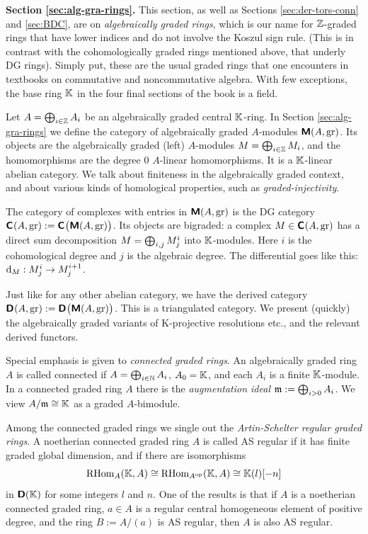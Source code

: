 \medskip \noindent 
{\bf Section \ref{sec:alg-gra-rings}.}
This section, as well as Sections \ref{sec:der-tors-conn} and \ref{sec:BDC}, 
are on {\em algebraically graded rings}, which is our name for 
$\mathbb{Z}$-graded rings that have lower indices and do not involve the Koszul sign 
rule.  (This is in contrast with the cohomologically graded rings mentioned 
above, that underly DG rings). Simply put, these are the usual graded rings 
that one encounters in textbooks on commutative and noncommutative algebra. 
With few exceptions, the base ring $\mathbb{K}$ in the four final sections of the book 
is a field. 

Let $A = \bigoplus\nolimits_{i \in \mathbb{Z}} A_i$ be an algebraically graded central $\mathbb{K}$-ring. 
In Section \ref{sec:alg-gra-rings} we define the category 
of algebraically graded $A$-modules $\boldsymbol{\mathsf{M}}(A, \mathrm{gr})$. 
Its objects are the algebraically graded (left) $A$-modules
$M = \bigoplus\nolimits_{i \in \mathbb{Z}} M_i$, and the homomorphisms are the degree $0$
$A$-linear homomorphisms. It is a $\mathbb{K}$-linear abelian category. 
We talk about finiteness in the algebraically graded context, and about 
various kinds of homological properties, such as {\em 
graded-injectivity}. 

The category of complexes with entries in $\boldsymbol{\mathsf{M}}(A, \mathrm{gr})$ is the DG 
category \lb 
$\boldsymbol{\mathsf{C}}_{}(A, \mathrm{gr}) := 
\boldsymbol{\mathsf{C}}_{} \bigl( \boldsymbol{\mathsf{M}}(A, \mathrm{gr}) \bigr)$.
Its objects are bigraded: a complex 
$M \in \boldsymbol{\mathsf{C}}_{}(A, \mathrm{gr})$ has a direct sum decomposition 
$M = \bigoplus\nolimits_{i, j} M^i_j$ into $\mathbb{K}$-modules. Here $i$ is the cohomological 
degree and $j$ is the algebraic degree. The differential goes like this:
$\mathrm{d}_M : M^i_j \to M^{i + 1}_j$. 

Just like for any other abelian category, we have the derived category 
$\boldsymbol{\mathsf{D}}_{}(A, \mathrm{gr}) := 
\boldsymbol{\mathsf{D}}_{} \bigl( \boldsymbol{\mathsf{M}}(A, \mathrm{gr}) \bigr)$.
This is a triangulated category. We present (quickly) the algebraically graded 
variants of K-projective resolutions etc., and the relevant derived functors.

Special emphasis is given to {\em connected graded rings}. An algebraically 
graded ring $A$ is called connected if $A = \bigoplus\nolimits_{i \in \mathbb{N}} A_i$, 
$A_0 = \mathbb{K}$, and each $A_i$ is a finite $\mathbb{K}$-module.
In a connected graded ring $A$ there is the {\em augmentation ideal} 
$\mathfrak{m} := \bigoplus\nolimits_{i > 0} A_i$. We view $A / \mathfrak{m} \cong \mathbb{K}$ as a graded 
$A$-bimodule. 

Among the connected graded rings we single out the {\em Artin-Schelter regular 
graded rings}. A noetherian connected graded ring $A$ is called AS regular if 
it has finite graded global dimension, and if there are isomorphisms
\begin{equation} \label{eqn:4621}
\operatorname{RHom}_{A}(\mathbb{K}, A) \cong \operatorname{RHom}_{A^{\mathrm{op}}}(\mathbb{K}, A) \cong
\mathbb{K}(l)[-n]
\end{equation}
in $\boldsymbol{\mathsf{D}}(\mathbb{K})$ for some integers $l$ and $n$. One of the results is that if 
$A$ is a noetherian connected graded ring, $a \in A$ is a regular central 
homogeneous element of positive degree, and the ring $B := A / (a)$ is AS 
regular, then $A$ is also AS regular. 


